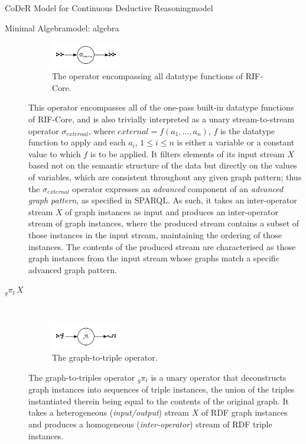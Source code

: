 \begin{nestedsection}{CoDeR Model for Continuous Deductive Reasoning}{model}
\begin{nestedsection}{Minimal Algebra}{model: algebra}
\begin{description}
\begin{figure}[b]
					\centering
					\includegraphics[width=0.3\textwidth]{datatype-function}
					\caption{The operator encompassing all datatype functions of RIF-Core.}
				\end{figure}
				This operator encompasses all of the one-pass built-in datatype functions of RIF-Core, and is also trivially interpreted as a unary stream-to-stream operator $\sigma_{external}$, where ${external = f(a_1,\dots,a_n)}$, $f$ is the datatype function to apply and each $a_i$, ${1 \leq i \leq n}$ is either a variable or a constant value to which $f$ is to be applied.
				It filters elements of its input stream $X$ based not on the semantic structure of the data but directly on the values of variables, which are consistent throughout any given graph pattern;
				thus the $\sigma_{external}$ operator expresses an \emph{advanced} component of an \emph{advanced graph pattern}, as specified in SPARQL.
				As such, it takes an inter-operator stream $X$ of graph instances as input and produces an inter-operator stream of graph instances, where the produced stream contains a subset of those instances in the input stream, maintaining the ordering of those instances.
				The contents of the produced stream are characterised as those graph instances from the input stream whose graphs match a specific advanced graph pattern.
			\item[${{}_g{\pi_t}\,X}$] \hfill \\
				\begin{figure}[t]
					\centering
					\includegraphics[width=0.3\textwidth]{graph-to-triple}
					\caption{The graph-to-triple operator.}
				\end{figure}
				The graph-to-triples operator ${{}_g{\pi_t}}$ is a unary operator that deconstructs graph instances into sequences of triple instances, the union of the triples instantiated therein being equal to the contents of the original graph.
				It takes a heterogeneous (\emph{input/output}) stream $X$ of RDF graph instances and produces a homogeneous (\emph{inter-operator}) stream of RDF triple instances.

\end{description}
\end{nestedsection}
\end{nestedsection}
